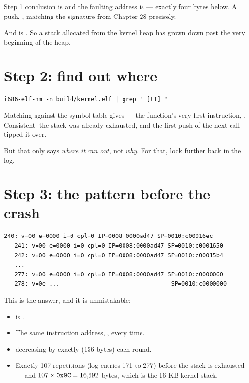\begin{concept}{Step 1 conclusion}
 is  and the faulting address is  --- exactly four bytes
below. A push. , matching the signature from Chapter 28
precisely.

And  is . So a stack allocated from the kernel heap has grown down
past the very beginning of the heap.
\end{concept}

\section{Step 2: find out where}

\begin{lstlisting}[style=sh]
i686-elf-nm -n build/kernel.elf | grep " [tT] "
\end{lstlisting}

Matching  against the symbol table gives  --- the
function's very first instruction, . Consistent: the stack was already exhausted, and
the first push of the next call tipped it over.

But that only says \emph{where it ran out}, not \emph{why}. For that, look further back in the log.

\section{Step 3: the pattern before the crash}

\begin{lstlisting}[style=txt]
   240: v=00 e=0000 i=0 cpl=0 IP=0008:0000ad47 SP=0010:c00016ec
   241: v=00 e=0000 i=0 cpl=0 IP=0008:0000ad47 SP=0010:c0001650
   242: v=00 e=0000 i=0 cpl=0 IP=0008:0000ad47 SP=0010:c00015b4
   ...
   277: v=00 e=0000 i=0 cpl=0 IP=0008:0000ad47 SP=0010:c0000060
   278: v=0e ...                                SP=0010:c0000000
\end{lstlisting}

This is the answer, and it is unmistakable:

\begin{itemize}
  \item {} is .
  \item The same instruction address, , every time.
  \item {} decreasing by exactly  (156 bytes) each round.
  \item Exactly 107 repetitions (log entries 171 to 277) before the stack is exhausted ---
        and $107 \times \texttt{0x9C} = 16{,}692$ bytes, which is the 16 KB kernel stack.
\end{itemize}

